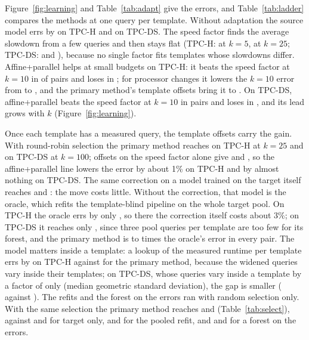 \documentclass[sigconf,review]{acmart}
\begin{document}
Figure~\ref{fig:learning} and Table~\ref{tab:adapt} give the errors, and
Table~\ref{tab:ladder} compares the methods at one query per template.
Without adaptation the source model errs by \PNoneTpchKTwoFive{} on TPC-H
and \PNoneTpcdsKOneZeroZero{} on TPC-DS. The speed factor finds the
average slowdown from a few queries and then stays flat (TPC-H:
\PSpeedTpchKFive{} at $k=5$, \PSpeedTpchKTwoFive{} at $k=25$; TPC-DS:
\PSpeedTpcdsKFive{} and \PSpeedTpcdsKTwoFive), because no single factor
fits templates whose slowdowns differ. Affine+parallel helps at small
budgets on TPC-H: it beats the speed factor at $k=10$ in \PAffTPCHBelow{}
of \PAffTPCHPairs{} pairs and loses in \PAffTPCHAbove; for processor
changes it lowers the $k=10$ error from \PATpchProcessorsRandomSpeedOneZero{}
to \PATpchProcessorsRandomAffineParallelOneZero, and the primary method's
template offsets bring it to \PATpchProcessorsRandomLowdimTemplateOneZero.
On TPC-DS, affine+parallel beats the speed factor at $k=10$ in
\PAffTPCDSBelow{} pairs and loses in \PAffTPCDSAbove, and its lead grows
with $k$ (Figure~\ref{fig:learning}).

Once each template has a measured query, the template offsets carry the
gain. With round-robin selection the primary method reaches
\PLadTpchLowdimTemplateRoundRobin{} on TPC-H at $k=25$ and
\PLadTpcdsLowdimTemplateRoundRobin{} on TPC-DS at $k=100$; offsets on the
speed factor alone give \PLadTpchTemplateRawRoundRobin{} and
\PLadTpcdsTemplateRawRoundRobin, so the affine+parallel line lowers the
error by about 1\% on TPC-H and by almost nothing on TPC-DS. The same
correction on a model trained on the target itself reaches
\PLadTpchLowdimTemplateControlRoundRobin{} and
\PLadTpcdsLowdimTemplateControlRoundRobin: the move costs little. Without
the correction, that model is the oracle, which refits the template-blind
pipeline on the whole target pool. On TPC-H the oracle errs by only
\PLadTpchOracleRandom, so there the correction itself costs about 3\%; on
TPC-DS it reaches only \PLadTpcdsOracleRandom, since three pool queries
per template are too few for its forest, and the primary method is
\PPrimOracleTPCDSMin{} to \PPrimOracleTPCDSMax{} times the oracle's error
in every pair. The model matters inside a template: a lookup of the
measured runtime per template errs by \PLadTpchLookupRoundRobin{} on TPC-H
against \PLadTpchLowdimTemplateRoundRobin{} for the primary method, because
the widened queries vary inside their templates; on TPC-DS, whose queries
vary inside a template by a factor of only \PSpreadTPCDS{} (median
geometric standard deviation), the gap is smaller
(\PLadTpcdsLookupRoundRobin{} against \PLadTpcdsLowdimTemplateRoundRobin).
The refits and the forest on the errors ran with random selection only.
With the same selection the primary method reaches
\PLTpchKTwoFiveRandomLowdimTemplate{} and
\PLTpcdsKOneZeroZeroRandomLowdimTemplate{} (Table~\ref{tab:select}),
against \PLadTpchTargetRandom{} and \PLadTpcdsTargetRandom{} for target
only, \PLadTpchPooledRandom{} and \PLadTpcdsPooledRandom{} for the pooled
refit, and \PLadTpchForestResidRandom{} and \PLadTpcdsForestResidRandom{}
for a forest on the errors.
\end{document}
